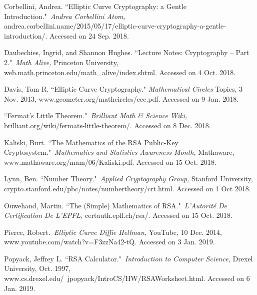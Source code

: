 \documentclass[a4paper,12pt]{article}
\theoremstyle{definition}
\begin{document}
\begin{flushleft}
Corbellini, Andrea. ``Elliptic Curve Cryptography: a Gentle Introduction." \textit{Andrea Corbellini Atom,} andrea.corbellini.name/2015/05/17/elliptic-curve-cryptography-a-gentle-introduction/. Accessed on 24 Sep. 2018.

Daubechies, Ingrid, and Shannon Hughes. ``Lecture Notes: Cryptography – Part 2." \textit{Math Alive,} Princeton University, web.math.princeton.edu/math\_alive/index.shtml. Accessed on 4 Oct. 2018.

Davis, Tom R. ``Elliptic Curve Cryptography." \textit{Mathematical Circles} Topics, 3 Nov. 2013, www.geometer.org/mathcircles/ecc.pdf. Accessed on 9 Jan. 2018.

``Fermat's Little Theorem." \textit{Brilliant Math \& Science Wiki,} brilliant.org/wiki/fermats-little-theorem/. Accessed on 8 Dec. 2018.

Kaliski, Burt. ``The Mathematics of the RSA Public-Key Cryptosystem." \textit{Mathematics and Statistics Awareness Month,} Mathaware, www.mathaware.org/mam/06/Kaliski.pdf. Accessed on 15 Oct. 2018.

Lynn, Ben. ``Number Theory." \textit{Applied Cryptography Group,} Stanford University, crypto.stanford.edu/pbc/notes/numbertheory/crt.html. Accessed on 1 Oct 2018.

Ouwehand, Martin. ``The (Simple) Mathematics of RSA." \textit{L'Autorité De Certification De L'EPFL,} certauth.epfl.ch/rsa/. Accessed on 15 Oct. 2018.

Pierce, Robert. \textit{Elliptic Curve Diffie Hellman,} YouTube, 10 Dec. 2014, www.youtube.com/watch?v=F3zzNa42-tQ. Accessed on 3 Jan. 2019.

Popyack, Jeffrey L. ``RSA Calculator." \textit{Introduction to Computer Science,} Drexel University, Oct. 1997, www.cs.drexel.edu/~jpopyack/IntroCS/HW/RSAWorksheet.html. Accessed on 6 Jan. 2019.


\end{flushleft}
\end{document}
